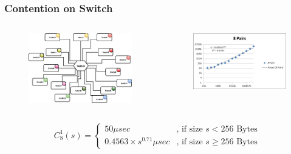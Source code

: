 \documentclass{beamer}
\begin{document}
\begin{frame}
\frametitle{Contention on Switch}
\begin{columns}[c]

\begin{figure}
\includegraphics[width=\linewidth,height=\textheight,keepaspectratio]{congestion8.jpg}
\end{figure}

\begin{figure}
\includegraphics[width=\linewidth,height=\textheight,keepaspectratio]{picture6.jpg}
\end{figure}

\end{columns}

\begin{block}{}
\begin{equation*}
C_8 ^1(s)=\begin{cases}
50 \mu sec & \text{, if size }s < 256 \text{ Bytes} \\
0.4563\times s^{0.71} \mu sec & \text{, if size } s \geq 256 \text{ Bytes}
\end{cases}
\end{equation*}
\end{block}
\end{frame}
\end{document}
